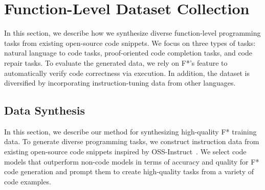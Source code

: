 \section{Function-Level Dataset Collection}
In this section, we describe how we synthesize diverse function-level programming tasks from existing open-source code snippets. We focus on three types of tasks: natural language to code tasks, proof-oriented code completion tasks, and code repair tasks. To evaluate the generated data, we rely on F*’s feature to automatically verify code correctness via execution. In addition, the dataset is diversified by incorporating instruction-tuning data from other languages.







\subsection{Data Synthesis}
In this section, we describe our method for synthesizing high-quality F* training data. To generate diverse programming tasks, we construct instruction data from existing open-source code snippets inspired by OSS-Instruct~\cite{wei2024magicoder}. We select code models that outperform non-code models in terms of accuracy and quality for F* code generation and prompt them to create high-quality tasks from a variety of code examples.



